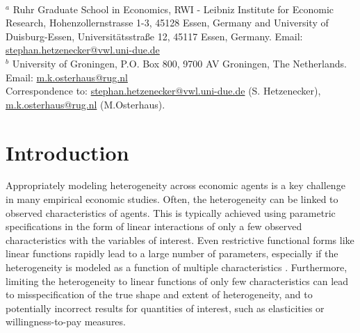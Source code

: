 \documentclass[a4paper, 12pt]{article}
\begin{document}
\begin{titlingpage}
\begin{abstract}
	
		
		
		

		
\vspace{0.4cm}
		
		
		
\end{abstract}
	

\vfill
\noindent\hrulefill \\
{\footnotesize{
$^a$ Ruhr Graduate School in Economics, RWI - Leibniz Institute for Economic Research, Hohenzollernstrasse 1-3, 45128 Essen, Germany and University of Duisburg-Essen, Universitätsstraße 12, 45117 Essen, Germany.   Email: \href{mailto:stephan.hetzenecker@vwl.uni-due.de}{stephan.hetzenecker@vwl.uni-due.de} \\
$^b$ University of Groningen, P.O. Box 800, 9700 AV Groningen, The Netherlands. Email: \href{mailto:m.k.osterhaus@rug.nl}{m.k.osterhaus@rug.nl}\\
Correspondence to:  \href{mailto:stephan.hetzenecker@vwl.uni-due.de}{stephan.hetzenecker@vwl.uni-due.de} (S. Hetzenecker), \href{mailto:m.k.osterhaus@rug.nl}{m.k.osterhaus@rug.nl} (M.Osterhaus).
}}
	
	
\end{titlingpage}

\onehalfspacing
\newpage

\section{Introduction}




Appropriately modeling heterogeneity across economic agents is a key challenge in many empirical economic studies. 
Often, the heterogeneity can be linked to observed characteristics of agents. This is typically achieved using parametric specifications 
in the form of linear interactions of only a few observed characteristics with the variables of interest. Even  restrictive functional forms like linear functions rapidly lead to a large number of parameters, especially if the heterogeneity is modeled as a function of multiple characteristics \cite{cranenburgh2021}. Furthermore, limiting the heterogeneity to linear functions of  only few  characteristics can  lead to  misspecification of the true shape and extent of heterogeneity, and  to potentially incorrect results for quantities of interest, such as elasticities or willingness-to-pay measures. 
\end{document}
